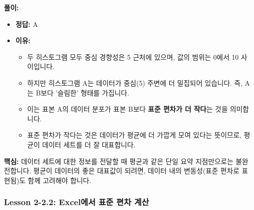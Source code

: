 \documentclass[11pt,a4paper]{book}
\theoremstyle{definition}
\begin{document}
\begin{examplebox}[title=연습 문제: 히스토그램을 통한 평균의 대표성 판단]
\textbf{풀이:}
\begin{itemize}
    \item \textbf{정답:} A
    \item \textbf{이유:}
    \begin{itemize}
        \item 두 히스토그램 모두 중심 경향성은 5 근처에 있으며, 값의 범위는 0에서 10 사이입니다.
        \item 하지만 히스토그램 A는 데이터가 중심(5) 주변에 더 밀집되어 있습니다. 즉, A는 B보다 '슬림한' 형태를 가집니다.
        \item 이는 표본 A의 데이터 분포가 표본 B보다 \textbf{표준 편차가 더 작다}는 것을 의미합니다.
        \item 표준 편차가 작다는 것은 데이터가 평균에 더 가깝게 모여 있다는 뜻이므로, 평균이 데이터 세트를 더 잘 대표합니다.
    \end{itemize}
\end{itemize}
\textbf{핵심:} 데이터 세트에 대한 정보를 전달할 때 평균과 같은 단일 요약 지점만으로는 불완전합니다. 평균이 데이터의 좋은 대표값이 되려면, 데이터 내의 변동성(표준 편차로 표현됨)도 함께 고려해야 합니다.
\end{examplebox}


\subsubsection*{Lesson 2-2.2: Excel에서 표준 편차 계산}
\end{document}
